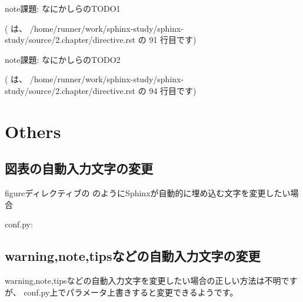 \documentclass[letterpaper,10pt,dvipdfmx,openany,oneside]{sphinxmanual}
\begin{document}
\begin{sphinxadmonition}{note}{課題:}
なにかしらのTODO1
\end{sphinxadmonition}

({\hyperref[\detokenize{source/2.chapter/directive:index-0}]{}} は、 /home/runner/work/sphinx-study/sphinx-study/source/2.chapter/directive.rst の 91 行目です)

\begin{sphinxadmonition}{note}{課題:}
なにかしらのTODO2
\end{sphinxadmonition}

({\hyperref[\detokenize{source/2.chapter/directive:index-1}]{}} は、 /home/runner/work/sphinx-study/sphinx-study/source/2.chapter/directive.rst の 94 行目です)


\chapter{Others}
\label{\detokenize{source/3.chapter/others:others}}\label{\detokenize{source/3.chapter/others::doc}}

\section{図表の自動入力文字の変更}
\label{\detokenize{source/3.chapter/others:id1}}
figureディレクティブの  のようにSphinxが自動的に埋め込む文字を変更したい場合

conf.py:

%
\begin{sphinxVerbatim}[commandchars=\\\{\}]
     
\end{sphinxVerbatim}


\section{warning,note,tipsなどの自動入力文字の変更}
\label{\detokenize{source/3.chapter/others:warning-note-tips}}
warning,note,tipsなどの自動入力文字を変更したい場合の正しい方法は不明ですが、
conf.py上でパラメータ上書きすると変更できるようです。
\end{document}
